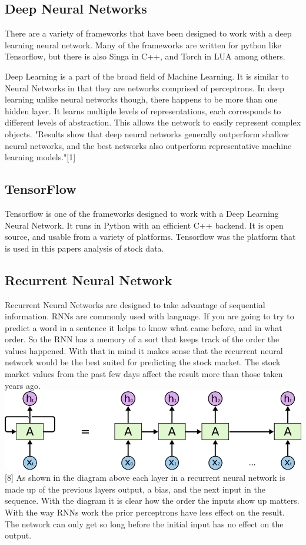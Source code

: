 \documentclass{article}
\begin{document}
\subsection{Deep Neural Networks}
There are a variety of frameworks that have been designed to work with a deep learning neural network. 
Many of the frameworks are written for python like Tensorflow, but there is also Singa in C++, and Torch in LUA among others.

Deep Learning is a part of the broad field of Machine Learning. 
It is similar to Neural Networks in that they are networks comprised of perceptrons.
In deep learning unlike neural networks though, there happens to be more than one hidden layer.
It learns multiple levels of representations, each corresponds to different levels of abstraction.
This allows the network to easily represent complex objects.
"Results show that deep neural networks
generally outperform shallow neural networks, and the best networks also outperform representative machine learning models."[1]


\subsection{TensorFlow}
Tensorflow is one of the frameworks designed to work with a Deep Learning Neural Network.
It runs in Python with an efficient C++ backend. 
It is open source, and usable from a variety of platforms. 
Tensorflow was the platform that is used in this papers analysis of stock data.

\subsection{Recurrent Neural Network}
Recurrent Neural Networks are designed to take advantage of sequential information.
RNNs are commonly used with language.
If you are going to try to predict a word in a sentence it helps to know what came before, and in what order.
So the RNN has a memory of a sort that keeps track of the order the values happened.
With that in mind it makes sense that the recurrent neural network would be the best suited for predicting the stock market.
The stock market values from the past few days affect the result more than those taken years ago. \\


\includegraphics[width=\textwidth]{0_WdbXF_e8kZI1R5nQ.png}[8]
As shown in the diagram above each layer in a recurrent neural network is made up of the previous layers output, a bias, and the next input in the sequence.
With the diagram it is clear how the order the inputs show up matters.
With the way RNNs work the prior perceptrons have less effect on the result.
The network can only get so long before the initial input has no effect on the output.
\end{document}
